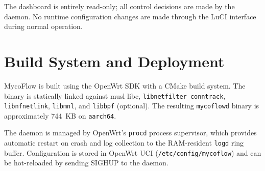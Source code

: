 The dashboard is entirely read-only; all control decisions are made by the daemon. No runtime configuration changes are made through the LuCI interface during normal operation.

\section{Build System and Deployment}

MycoFlow is built using the OpenWrt SDK with a CMake build system. The binary is statically linked against musl libc, \texttt{libnetfilter\_conntrack}, \texttt{libnfnetlink}, \texttt{libmnl}, and \texttt{libbpf} (optional). The resulting \texttt{mycoflowd} binary is approximately 744~KB on \texttt{aarch64}.

The daemon is managed by OpenWrt's \texttt{procd} process supervisor, which provides automatic restart on crash and log collection to the RAM-resident \texttt{logd} ring buffer. Configuration is stored in OpenWrt UCI (\texttt{/etc/config/mycoflow}) and can be hot-reloaded by sending SIGHUP to the daemon.
